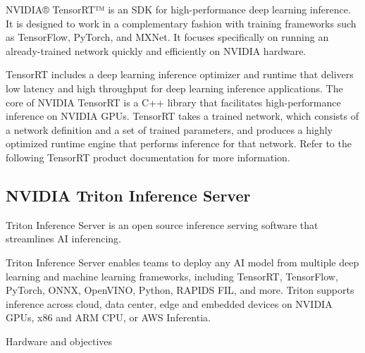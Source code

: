\documentclass{article}
\begin{document}
NVIDIA® TensorRT™ is an SDK for high-performance deep learning inference. It is designed to work in a complementary fashion with training frameworks such as TensorFlow, PyTorch, and MXNet. It focuses specifically on running an already-trained network quickly and efficiently on NVIDIA hardware.

TensorRT includes a deep learning inference optimizer and runtime that delivers low latency and high throughput for deep learning inference applications. The core of NVIDIA TensorRT is a C++ library that facilitates high-performance inference on NVIDIA GPUs. TensorRT takes a trained network, which consists of a network definition and a set of trained parameters, and produces a highly optimized runtime engine that performs inference for that network. Refer to the following TensorRT product documentation for more information.

\subsection{NVIDIA Triton Inference Server}

Triton Inference Server is an open source inference serving software that streamlines AI inferencing.

Triton Inference Server enables teams to deploy any AI model from multiple deep learning and machine learning frameworks, including TensorRT, TensorFlow, PyTorch, ONNX, OpenVINO, Python, RAPIDS FIL, and more. Triton supports inference across cloud, data center, edge and embedded devices on NVIDIA GPUs, x86 and ARM CPU, or AWS Inferentia.


Hardware and objectives


\end{document}
